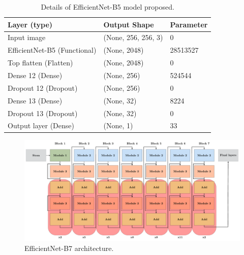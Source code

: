 \documentclass[12pt]{diazessay}
\newcounter{subsubsubsection}[subsubsection]
\begin{document}
    
    \begin{table}[H]
        \begin{center}
        \begin{tabular}{lll}
            \hline
            \textbf{ Layer (type)} & \textbf{Output Shape} & \textbf{Parameter} \\
            \hline
            Input image & (None, 256, 256, 3) & 0 \\
            EfficientNet-B5 (Functional) & (None, 2048)   & 28513527 \\
            Top flatten (Flatten) & (None, 2048) & 0 \\
            Dense 12 (Dense) & (None, 256) & 524544 \\
            Dropout 12 (Dropout) & (None, 256) & 0 \\
            Dense 13 (Dense)& (None, 32) & 8224\\
            Dropout 13 (Dropout) & (None, 32) & 0\\
            Output layer (Dense)  & (None, 1)  & 33\\
        \hline
        \end{tabular}
        \end{center}
        \caption[Details of EfficientNet-B5 Model Proposed]{\centering Details of EfficientNet-B5 model proposed.}
    \end{table}

    

    \begin{figure}[H]
        \centering
        \includegraphics[width=16cm]{Architectures figures/EfficientNetB7.pdf}
        \caption[EfficientNetB7 architecture]{EfficientNet-B7 architecture.}
    \end{figure}
    
\end{document}
